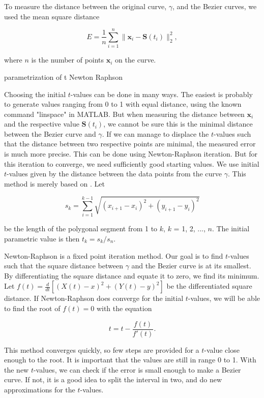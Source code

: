 \documentclass[10pt]{article}
\begin{document}
To measure the distance between the original curve, $\gamma$, and the Bezier curves, we used the mean square distance 

\begin{equation}
E = \frac{1}{n} \sum_{i=1}^{n} \|\mathbf{x}_i - \mathbf{S}(t_i)\|^2_2,
\end{equation}

where $n$ is the number of points $\mathbf{x}_i$ on the curve. 

parametrization of t
Newton Raphson

Choosing the initial $t$-values can be done in many ways. The easiest is probably to generate values ranging from 0 to 1 with equal distance, using the known command "linspace" in MATLAB. But when measuring the distance between $\mathbf{x}_i$ and the respective value $\mathbf{S}(t_i)$, we cannot be sure this is the minimal distance between the Bezier curve and $\gamma$. If we can manage to displace the $t$-values such that the distance between two respective points are minimal, the measured error is much more precise. This can be done using Newton-Raphson iteration. But for this iteration to converge, we need sufficiently good starting values. We use initial $t$-values given by the distance between the data points from the curve $\gamma$. This method is merely based on \cite{Plass:1983}. Let

\begin{equation}
s_k = \sum_{i=1}^{k-1} \sqrt{(x_{i+1}-x_i)^2 + (y_{i+1}-y_i)^2}
\end{equation}

be the length of the polygonal segment from 1 to $k$, $k$ = 1, 2, ..., $n$. The initial parametric value is then $t_k = s_k/s_n$.

Newton-Raphson is a fixed point iteration method. Our goal is to find $t$-values such that the square distance between $\gamma$ and the Bezier curve is at its smallest. By  differentiating the square distance and equate it to zero, we find its minimum. Let $f(t) = \frac{d}{dt} [(X(t)-x)^2 + (Y(t)-y)^2 ]$ be the differentiated square distance. If Newton-Raphson does converge for the initial $t$-values, we will be able to find the root of $f(t) = 0$ with the equation

\begin{equation}
t = t - \frac{f(t)}{f'(t)}.
\end{equation}

This method converges quickly, so few steps are provided for a $t$-value close enough to the root. It is important that the values are still in range 0 to 1. With the new $t$-values, we can check if the error is small enough to make a Bezier curve. If not, it is a good idea to split the interval in two, and do new approximations for the $t$-values.
\end{document}
